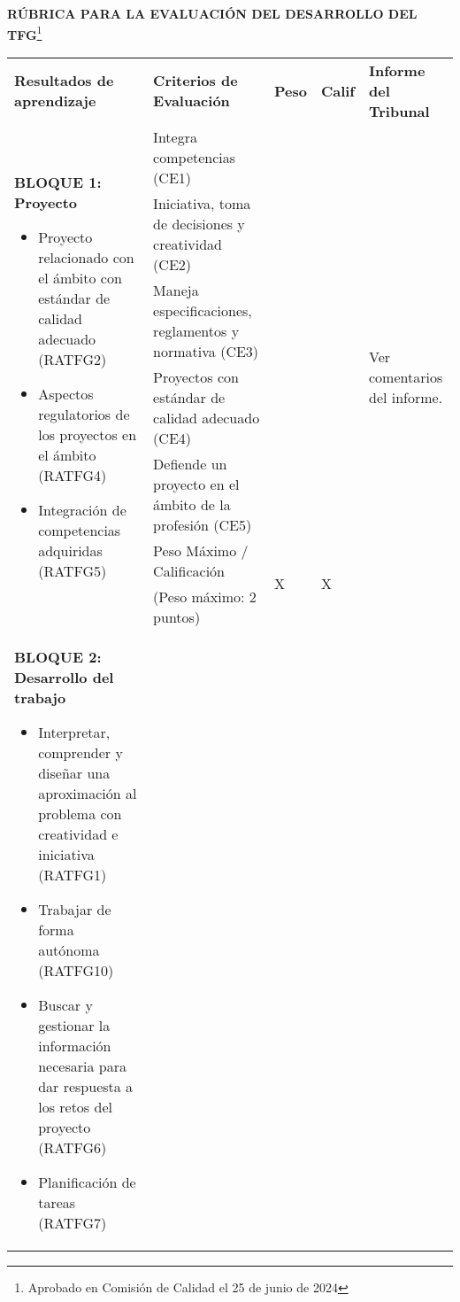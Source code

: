 \begin{landscape}
\thispagestyle{plain}
\noindent \textbf{RÚBRICA PARA LA EVALUACIÓN DEL DESARROLLO DEL TFG}\footnote{Aprobado en Comisión de Calidad el 25 de junio de 2024}
\renewcommand{\arraystretch}{1.3} %

\begin{table}[ht]
  \centering
  \small
\begin{tabularx}{\linewidth}{|p{7cm}|p{9cm}|p{1cm}|p{1cm}|p{5cm}|}
\cline{1-5}
\textbf{Resultados de aprendizaje} & \textbf{Criterios de Evaluación} & \textbf{Peso} & \textbf{Calif} & \textbf{Informe del Tribunal} \\ \cline{1-5}
  \multirow{7}{=}{%
  \begin{minipage}[t]{7cm}
    \textbf{BLOQUE 1: Proyecto}
    \begin{itemize}[left=5pt, itemsep=1pt, topsep=1pt]
      \item Proyecto relacionado con el ámbito con estándar de calidad adecuado (RATFG2)
      \item Aspectos regulatorios de los proyectos en el ámbito (RATFG4)
      \item Integración de competencias adquiridas (RATFG5)
    \end{itemize}
  \end{minipage}}
    & Integra competencias (CE1) &  &  & \multirow[c]{7}{=}{\centering \footnotesize Ver comentarios del informe.} \\ \cline{2-4}
    & Iniciativa, toma de decisiones y creatividad (CE2) &  &  &  \\ \cline{2-4}
    & Maneja especificaciones, reglamentos y normativa (CE3) &  &  &  \\ \cline{2-4}
    & Proyectos con estándar de calidad adecuado (CE4) &  &  &  \\ \cline{2-4}
    & Defiende un proyecto en el ámbito de la profesión (CE5) &  &  &  \\ \cline{2-4}
    & \cellcolor[HTML]{C0C0C0}Peso Máximo / Calificación & \multirow[c]{2}{=}{\centering X} & \multirow[c]{2}{=}{\centering X} &  \\
    & \cellcolor[HTML]{C0C0C0}(Peso máximo: 2 puntos) &  &  &  \\ \cline{1-5}
  \multirow{6}{=}{%
  \begin{minipage}[t]{7cm}
    \vspace{1mm}
    \textbf{BLOQUE 2: Desarrollo del trabajo}
    \begin{itemize}[left=5pt, itemsep=1pt, topsep=1pt]
      \item Interpretar, comprender y diseñar una aproximación al problema con creatividad e iniciativa (RATFG1)
      \item Trabajar de forma autónoma (RATFG10)
      \item Buscar y gestionar la información necesaria para dar respuesta a los retos del proyecto (RATFG6)
      \item Planificación de tareas (RATFG7)
    \end{itemize}
  \end{minipage}}


\end{tabularx}
\end{table}
\end{landscape}
